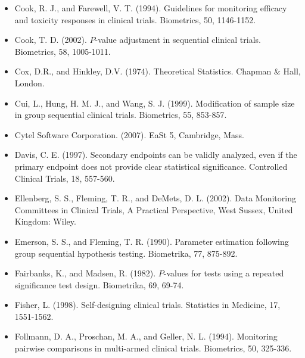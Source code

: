 \documentclass[10pt]{article}
\begin{document}
\begin{itemize}
  \item[10.] Cook, R. J., and Farewell, V. T. (1994). Guidelines for monitoring efficacy and toxicity responses in clinical trials. Biometrics, 50, 1146-1152.
  \item[11.] Cook, T. D. (2002). $P$-value adjustment in sequential clinical trials. Biometrics, 58, 1005-1011.
  \item[12.] Cox, D.R., and Hinkley, D.V. (1974). Theoretical Statistics. Chapman \& Hall, London.
  \item[13.] Cui, L., Hung, H. M. J., and Wang, S. J. (1999). Modification of sample size in group sequential clinical trials. Biometrics, 55, 853-857.
  \item[14.] Cytel Software Corporation. (2007). EaSt 5, Cambridge, Mass.
  \item[15.] Davis, C. E. (1997). Secondary endpoints can be validly analyzed, even if the primary endpoint does not provide clear statistical significance. Controlled Clinical Trials, 18, 557-560.
  \item[16.] Ellenberg, S. S., Fleming, T. R., and DeMets, D. L. (2002). Data Monitoring Committees in Clinical Trials, A Practical Perspective, West Sussex, United Kingdom: Wiley.
  \item[17.] Emerson, S. S., and Fleming, T. R. (1990). Parameter estimation following group sequential hypothesis testing. Biometrika, 77, 875-892.
  \item[18.] Fairbanks, K., and Madsen, R. (1982). $P$-values for tests using a repeated significance test design. Biometrika, 69, 69-74.
  \item[19.] Fisher, L. (1998). Self-designing clinical trials. Statistics in Medicine, 17, 1551-1562.
  \item[20.] Follmann, D. A., Proschan, M. A., and Geller, N. L. (1994). Monitoring pairwise comparisons in multi-armed clinical trials. Biometrics, 50, 325-336.
\end{itemize}
\end{document}

